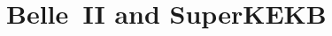 \documentclass[xcolor=dvipsnames]{beamer}
\begin{document}

   \section{Belle~II and SuperKEKB}
\end{document}
